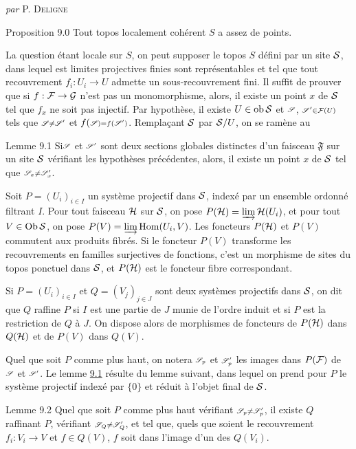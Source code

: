 \documentclass[10pt]{../fichiers-configuration-latex/smfart}
\begin{document}
\centerline{\textit{par} P. \textsc{Deligne}}

\medskip
\begin{enonce*}{Proposition 9.0}
Tout topos localement cohérent $S$ a assez de points.
\end{enonce*}

La question étant locale sur $S$, on peut supposer le topos $S$
défini par un site $\Ss$, dans lequel est limites projectives finies
sont représentables et tel que tout recouvrement $f_i : U_i \to U$
admette un sous-recouvrement fini. Il suffit de prouver que si $f :
\Ff \to \Gg$ n'est pas un monomorphisme, alors, il existe un point
$x$ de $\Ss$ tel que $f_x$ ne soit pas injectif. Par hypothèse, il
existe $U \in \ob \Ss$ et $\ss$, $\ss'\in \Ff(U)$ tels que $\ss \neq
\ss'$ et $f(\ss) = f(\ss')$. Remplaçant $\Ss$ par $\Ss/U$, on se
ramène au

\begin{enonce*}{Lemme 9.1}
Si\pageoriginale $\ss$ et $\ss'$ sont deux sections globales distinctes d'un faisceau
$\mathfrak{F}$ sur un site $\Ss$ vérifiant les hypothèses précédentes,
alors, il existe un point $x$ de $\Ss$ tel que $\ss_x
\neq \ss'_x$.
\end{enonce*}

Soit $P = (U_i)_{i \in I}$ un système projectif dans $\Ss$, indexé par
un ensemble ordonné filtrant $I$. Pour tout faisceau $\Hh$ sur
$\Ss$, on pose $P(\Hh) = \varinjlim \Hh(U_i)$, et pour
tout $V \in \Ob \Ss$, on pose $P(V) = \varinjlim \Hom (U_i, V)$. Les
foncteurs $P(\Hh)$ et $P(V)$ commutent aux produits fibrés. Si
le foncteur $P(V)$ transforme les recouvrements en familles
surjectives de fonctions, c'est un morphisme de sites du topos
ponctuel dans $\Ss$, et $P(\Hh)$ est le foncteur fibre
correspondant.

Si $P = (U_i)_{i \in I}$ et $Q = (V_j)_{j \in J}$ sont deux systèmes
projectifs dans $\Ss$, on dit que $Q$ raffine $P$ si $I$ est une partie
de $J$ munie de l'ordre induit et si $P$ est la restriction de $Q$ à
$J$. On dispose alors de morphismes de foncteurs de $P(\Hh)$
dans $Q(\Hh)$ et de $P(V)$ dans $Q(V)$.

Quel que soit $P$ comme plus haut, on notera $\ss_p$ et
$\ss'_p$ les images dans $P(\Ff)$ de $\ss$ et $\ss'$. Le lemme \hyperref[VI.lem9.1]{9.1} résulte du
lemme suivant, dans lequel on prend pour $P$ le système projectif
indexé par $\{0\}$ et réduit à l'objet final de $\Ss$.

\begin{enonce*}{Lemme 9.2}
Quel que soit $P$ comme plus haut vérifiant $\ss_p \neq \ss'_p$, il
existe $Q$ raffinant $P$, vérifiant $\ss_Q \neq \ss'_Q$, et tel que,
quels que soient le recouvrement $f_i : V_i \to V$ et $f \in Q(V)$,
$f$ soit dans l'image d'un des $Q(V_i)$.
\end{enonce*}
\end{document}
